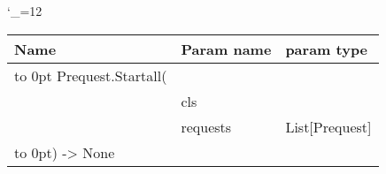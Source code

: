 \begingroup \catcode`\_=12 \tt
\begin{tabular}{lll}
\toprule
\textrm{Name}&\textrm{Param name}&\textrm{param type}\\
\midrule
\hbox to 0pt {Prequest.Startall(\hss}\\
& cls\\
& requests & List[Prequest]\\
\hbox to 0pt{) -> None\hss}\\
\bottomrule
\end{tabular}
\endgroup

